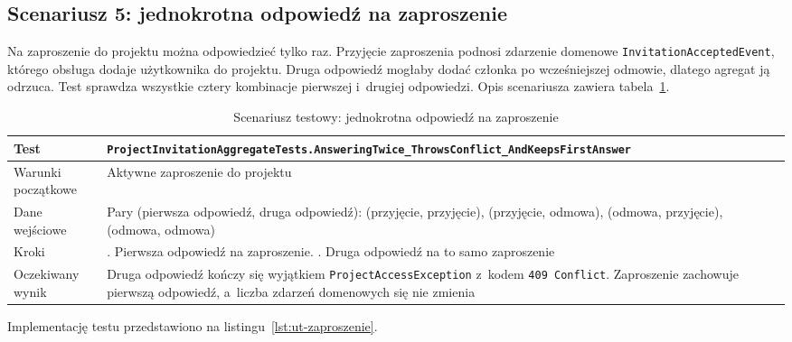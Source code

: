 \subsection{Scenariusz 5: jednokrotna odpowiedź na zaproszenie}
Na zaproszenie do projektu można odpowiedzieć tylko raz. Przyjęcie zaproszenia podnosi zdarzenie domenowe
\texttt{InvitationAcceptedEvent}, którego obsługa dodaje użytkownika do projektu. Druga odpowiedź mogłaby dodać członka
po wcześniejszej odmowie, dlatego agregat ją odrzuca. Test sprawdza wszystkie cztery kombinacje pierwszej i~drugiej
odpowiedzi. Opis scenariusza zawiera tabela~\ref{tab:ut-zaproszenie}.

\begin{table}[htb]
    \centering
    \caption{Scenariusz testowy: jednokrotna odpowiedź na zaproszenie}
    \label{tab:ut-zaproszenie}
    \small
    \begin{tabularx}{\linewidth}{@{}>{\raggedright\arraybackslash}p{3.5cm} >{\raggedright\arraybackslash}X@{}}
        \hline
        Test & \texttt{ProjectInvitationAggregateTests.\allowbreak{}AnsweringTwice\_\allowbreak{}ThrowsConflict\_\allowbreak{}AndKeepsFirstAnswer} \\ \hline
        Warunki początkowe & Aktywne zaproszenie do projektu \\ \hline
        Dane wejściowe & Pary (pierwsza odpowiedź, druga odpowiedź): (przyjęcie, przyjęcie), (przyjęcie, odmowa), (odmowa, przyjęcie), (odmowa, odmowa) \\ \hline
        Kroki & 1. Pierwsza odpowiedź na zaproszenie. \newline 2. Druga odpowiedź na to samo zaproszenie \\ \hline
        Oczekiwany wynik & Druga odpowiedź kończy się wyjątkiem \texttt{ProjectAccessException} z~kodem \texttt{409 Conflict}. Zaproszenie zachowuje pierwszą odpowiedź, a~liczba zdarzeń domenowych się nie zmienia \\ \hline
    \end{tabularx}
\end{table}

Implementację testu przedstawiono na listingu~\ref{lst:ut-zaproszenie}.

